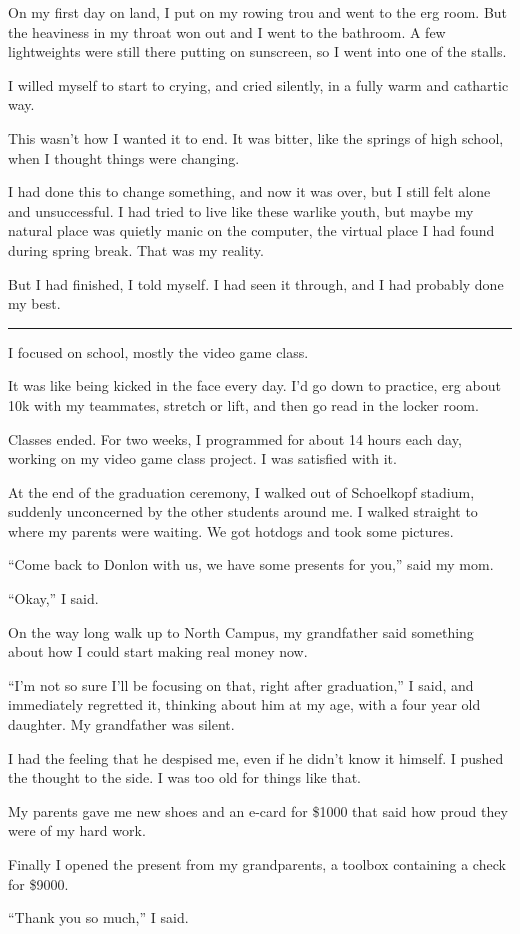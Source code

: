 On my first day on land, I put on my rowing trou and went to the erg room.  But
the heaviness in my throat won out and I went to the bathroom.  A few
lightweights were still there putting on sunscreen, so I went into one of the
stalls.  

I willed myself to start to crying, and cried silently, in a fully warm and
cathartic way.  

This wasn't how I wanted it to end.  It was bitter, like the springs of high
school, when I thought things were changing.  

I had done this to change something, and now it was over, but I still felt alone
and unsuccessful.  I had tried to live like these warlike youth, but maybe my
natural place was quietly manic on the computer, the virtual place I had found
during spring break.  That was my reality.

But I had finished, I told myself.  I had seen it through, and I had probably
done my best.

\plainfancybreak{12pt}{2}{}

I focused on school, mostly the video game class.

It was like being kicked in the face every day.  I'd go down to practice, erg
about 10k with my teammates, stretch or lift, and then go read in the locker
room.

Classes ended.  For two weeks, I programmed for about 14 hours each day, working
on my video game class project.  I was satisfied with it.

At the end of the graduation ceremony, I walked out of Schoelkopf stadium,
suddenly unconcerned by the other students around me.  I walked straight to
where my parents were waiting.  We got hotdogs and took some pictures.  

``Come back to Donlon with us, we have some presents for you,'' said my mom. 

``Okay,'' I said.  

On the way long walk up to North Campus, my grandfather said something about how
I could start making real money now.

``I'm not so sure I'll be focusing on that, right after graduation,'' I said,
and immediately regretted it, thinking about him at my age, with a four year old
daughter.  My grandfather was silent.  

I had the feeling that he despised me, even if he didn't know it himself.  I
pushed the thought to the side.  I was too old for things like that.

My parents gave me new shoes and an e-card for \$1000 that said how proud they
were of my hard work.  

Finally I opened the present from my grandparents, a toolbox containing a check
for \$9000.  

``Thank you so much,'' I said.
